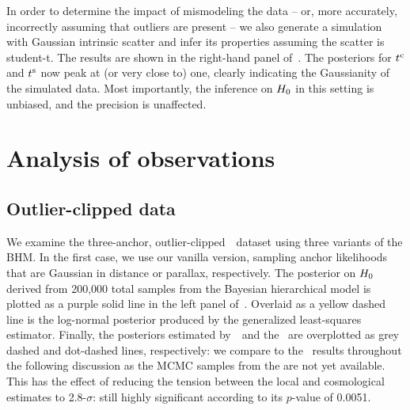 \documentclass[a4paper,fleqn,usenatbib]{mnras}
\newcommand{\riess}{\citetalias{Riess_etal:2016}}
\newcommand{\tpeak}{t}
\newcommand{\studentdist}{student-t}
\newcommand{\tpeakc}{\ensuremath{\tpeak^{\rm c}}}
\newcommand{\tpeaks}{\ensuremath{\tpeak^{\rm s}}}
\begin{document}
{In order to determine the impact of mismodeling the data -- or, more accurately, incorrectly assuming that outliers are present -- we also generate a simulation with Gaussian intrinsic scatter and infer its properties assuming the scatter is \studentdist. The results are shown in the right-hand panel of~. The posteriors for $\tpeakc$ and $\tpeaks$ now peak at (or very close to) one, clearly indicating the Gaussianity of the simulated data. Most importantly, the inference on $H_0$ in this setting is unbiased, and the precision is unaffected.


\section{Analysis of observations}
\label{section:results}

\subsection{Outlier-clipped data}

We examine the three-anchor, outlier-clipped~\riess\ dataset using three variants of the BHM. In the first case, we use our vanilla version, sampling anchor likelihoods that are Gaussian in distance or parallax, respectively. The posterior on $H_0$ derived from 200,000 total samples from the Bayesian hierarchical model is plotted as a purple solid line in the left panel of~. Overlaid as a yellow dashed line is the log-normal posterior produced by the generalized least-squares estimator. Finally, the posteriors estimated by~\riess\ and the~\citet{Planck_XIII:2016} are overplotted as grey dashed and dot-dashed lines, respectively: we compare to the~\citet{Planck_XIII:2016} results throughout the following discussion as the MCMC samples from the \citet{Planck_Int_XLVI:2016} are not yet available. This has the effect of reducing the tension between the local and cosmological estimates to 2.8-$\sigma$: still highly significant according to its $p$-value of 0.0051.

}
\end{document}
